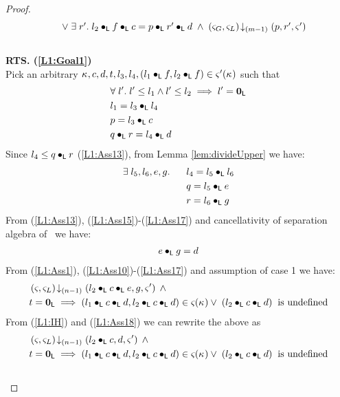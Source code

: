\begin{lemma}
\begin{proof}
\begin{align}
\begin{array}{l}
		\hspace*{0.4cm}\lor\; \exists\; r'.\; l_2 \bullet_{\textsf{L}} f \bullet_{\textsf{L}} c = p \bullet_{\textsf{L}} r' \bullet_{\textsf{L}} d \;\land\; \left(\varsigma_{G}, \varsigma_{L}\right) \!\downarrow_{(m-1)} \left(p, r', \varsigma_{}'\right)
	\end{array}
	\label{L1:Goal2}\\\nonumber
\end{align}
%
\textbf{RTS. (\ref{L1:Goal1})}\\
Pick an arbitrary $\kappa_{}, c, d, t, l_3, l_4, (l_1 \bullet_{\textsf{L}} f, l_2 \bullet_{\textsf{L}} f) \in \varsigma_{}'(\kappa_{})$ such that
%
\begin{align}
	&\forall\; l'.\; l' \leq l_1 \land l' \leq l_2 \implies l' = \mathbf{0}_{\textsf{L}} \label{L1:Ass10}\\
	& l_1 = l_3 \bullet_{\textsf{L}} l_4 \label{L1:Ass11}\\
	& p = l_3 \bullet_{\textsf{L}} c \label{L1:Ass12}\\
	& q \bullet_{\textsf{L}} r = l_4 \bullet_{\textsf{L}} d \label{L1:Ass13}
\end{align}
Since $l_4 \leq q \bullet_{\textsf{L}} r$ (\ref{L1:Ass13}), from Lemma \ref{lem:divideUpper} we have:
%
\begin{align}
	\exists\; l_5, l_6, e, g.\; \hspace*{0.5cm} & l_4 = l_5 \bullet_{\textsf{L}} l_6 \label{L1:Ass15}\\
	& q = l_5 \bullet_{\textsf{L}} e \label{L1:Ass16}\\
	& r = l_6 \bullet_{\textsf{L}} g \label{L1:Ass17}
\end{align}
%
From (\ref{L1:Ass13}), (\ref{L1:Ass15})-(\ref{L1:Ass17}) and cancellativity of separation algebra of \LState\ we have:
%
\begin{align}
	e \bullet_{\textsf{L}} g = d \label{L1:Ass18}
\end{align}
%
From (\ref{L1:Ass1}), (\ref{L1:Ass10})-(\ref{L1:Ass17}) and assumption of case 1 we have:
%
\begin{align}
	&\left(\varsigma_{}, \varsigma_{L}\right) \!\downarrow_{(n-1)} \left(l_2 \bullet_{\textsf{L}} c \bullet_{\textsf{L}} e, g, \varsigma_{}'\right) \;\land \nonumber\\
	& t = \mathbf{0}_{\textsf{L}} \implies (l_1 \bullet_{\textsf{L}} c \bullet_{\textsf{L}}  d, l_2 \bullet_{\textsf{L}} c \bullet_{\textsf{L}} d) \in \varsigma_{}(\kappa_{}) \lor\; (l_2 \bullet_{\textsf{L}} c \bullet_{\textsf{L}} d) \hspace*{0.2cm}\text{is undefined} \nonumber
\end{align}
From (\ref{L1:IH}) and (\ref{L1:Ass18}) we can rewrite the above as 
%
\begin{align}
	&\left(\varsigma_{}, \varsigma_{L}\right) \!\downarrow_{(n-1)} \left(l_2 \bullet_{\textsf{L}} c, d, \varsigma_{}'\right) \;\land \nonumber\\
	& t = \mathbf{0}_{\textsf{L}} \implies (l_1 \bullet_{\textsf{L}} c \bullet_{\textsf{L}}  d, l_2 \bullet_{\textsf{L}} c \bullet_{\textsf{L}} d) \in \varsigma_{}(\kappa_{}) \lor\; (l_2 \bullet_{\textsf{L}} c \bullet_{\textsf{L}} d) \hspace*{0.2cm}\text{is undefined} \nonumber
\end{align}\\
%
%
%
%


\end{proof}
\end{lemma}

